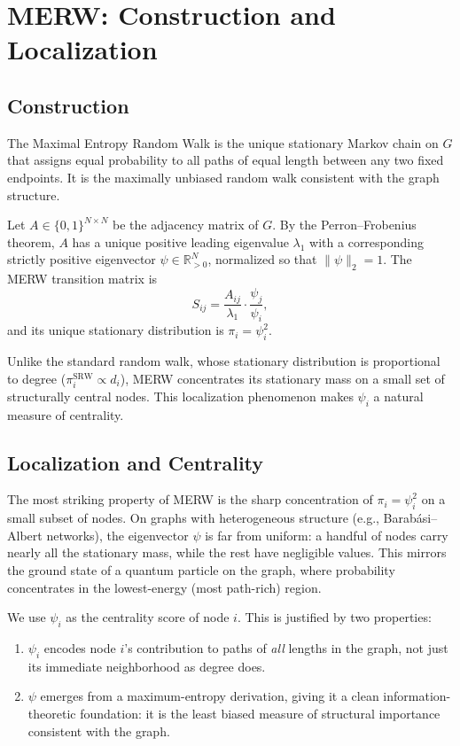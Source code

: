 \documentclass{article}
\begin{document}
\section{MERW: Construction and Localization}
\label{app:merw}

\subsection{Construction}

The Maximal Entropy Random Walk \citep{burda2009localization} is the unique stationary Markov chain on $G$ that assigns equal probability to all paths of equal length between any two fixed endpoints. It is the maximally unbiased random walk consistent with the graph structure.

Let $A \in \{0,1\}^{N \times N}$ be the adjacency matrix of $G$. By the Perron--Frobenius theorem, $A$ has a unique positive leading eigenvalue $\lambda_1$ with a corresponding strictly positive eigenvector $\psi \in \mathbb{R}^N_{>0}$, normalized so that $\|\psi\|_2 = 1$. The MERW transition matrix is
\[
S_{ij} = \frac{A_{ij}}{\lambda_1} \cdot \frac{\psi_j}{\psi_i},
\]
and its unique stationary distribution is $\pi_i = \psi_i^2$.

Unlike the standard random walk, whose stationary distribution is proportional to degree ($\pi_i^{\mathrm{SRW}} \propto d_i$), MERW concentrates its stationary mass on a small set of structurally central nodes. This localization phenomenon \citep{burda2009localization} makes $\psi_i$ a natural measure of centrality.

\subsection{Localization and Centrality}

The most striking property of MERW is the sharp concentration of $\pi_i = \psi_i^2$ on a small subset of nodes. On graphs with heterogeneous structure (e.g., Barab\'{a}si--Albert networks), the eigenvector $\psi$ is far from uniform: a handful of nodes carry nearly all the stationary mass, while the rest have negligible values. This mirrors the ground state of a quantum particle on the graph, where probability concentrates in the lowest-energy (most path-rich) region.

We use $\psi_i$ as the centrality score of node $i$. This is justified by two properties:
\begin{enumerate}
    \item $\psi_i$ encodes node $i$'s contribution to paths of \emph{all} lengths in the graph, not just its immediate neighborhood as degree does.
    \item $\psi$ emerges from a maximum-entropy derivation, giving it a clean information-theoretic foundation: it is the least biased measure of structural importance consistent with the graph.
\end{enumerate}
\end{document}

